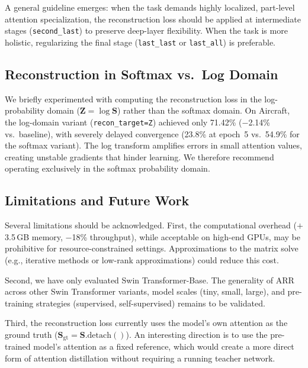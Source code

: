 \documentclass[review,12pt,authoryear]{elsarticle}
\newcommand{\method}{ARR}
\begin{document}
A general guideline emerges: when the task demands highly localized, part-level attention specialization, the reconstruction loss should be applied at intermediate stages (\texttt{second\_last}) to preserve deep-layer flexibility.
When the task is more holistic, regularizing the final stage (\texttt{last\_last} or \texttt{last\_all}) is preferable.

\subsection{Reconstruction in Softmax vs.\ Log Domain}
\label{sec:disc:domain}

We briefly experimented with computing the reconstruction loss in the log-probability domain ($\mathbf{Z} = \log \mathbf{S}$) rather than the softmax domain.
On Aircraft, the log-domain variant (\texttt{recon\_target=Z}) achieved only 71.42\% ($-$2.14\% vs.\ baseline), with severely delayed convergence (23.8\% at epoch~5 vs.\ 54.9\% for the softmax variant).
The log transform amplifies errors in small attention values, creating unstable gradients that hinder learning.
We therefore recommend operating exclusively in the softmax probability domain.

\subsection{Limitations and Future Work}
\label{sec:disc:limitations}

Several limitations should be acknowledged.
First, the computational overhead ($+$3.5\,GB memory, $-$18\% throughput), while acceptable on high-end GPUs, may be prohibitive for resource-constrained settings.
Approximations to the matrix solve (e.g., iterative methods or low-rank approximations) could reduce this cost.

Second, we have only evaluated Swin Transformer-Base.
The generality of \method{} across other Swin Transformer variants, model scales (tiny, small, large), and pre-training strategies (supervised, self-supervised) remains to be validated.

Third, the reconstruction loss currently uses the model's own attention as the ground truth ($\mathbf{S}_{\text{gt}} = \mathbf{S}.\text{detach}()$).
An interesting direction is to use the pre-trained model's attention as a fixed reference, which would create a more direct form of attention distillation without requiring a running teacher network.

\end{document}
